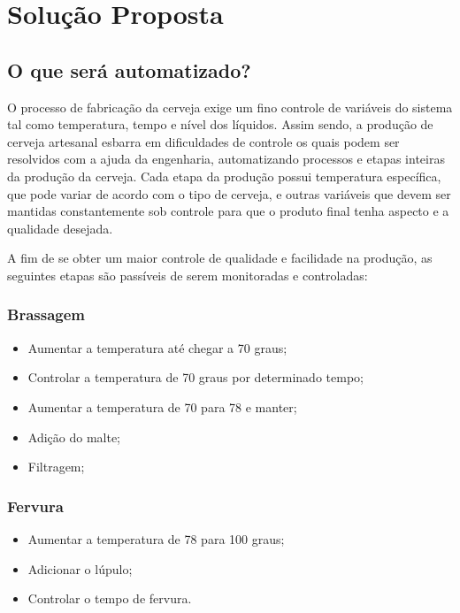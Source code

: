 \section{Solução Proposta}

\subsection{O que será automatizado?}

O processo de fabricação da cerveja exige um fino controle de variáveis do sistema tal como temperatura, tempo e nível dos líquidos. Assim sendo, a produção de cerveja artesanal esbarra em dificuldades de controle os quais podem ser resolvidos com a ajuda da engenharia, automatizando processos e etapas inteiras da produção da cerveja. Cada etapa da produção possui temperatura específica, que pode variar de acordo com o tipo de cerveja, e outras variáveis que devem ser mantidas constantemente sob controle para que o produto final tenha aspecto e a qualidade desejada.

A fim de se obter um maior controle de qualidade e facilidade na produção, as seguintes etapas são passíveis de serem monitoradas e controladas:

\subsubsection{Brassagem}
\begin{itemize}
    \item Aumentar a temperatura até chegar a 70 graus;
    \item Controlar a temperatura de 70 graus por determinado tempo;
    \item Aumentar a temperatura de 70 para 78 e manter;
    \item Adição do malte;
    \item Filtragem;
\end{itemize}

\subsubsection{Fervura}
\begin{itemize}
    \item Aumentar a temperatura de 78 para 100 graus;
    \item Adicionar o lúpulo;
    \item Controlar o tempo de fervura.
\end{itemize}


